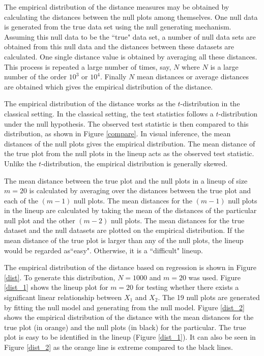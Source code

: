 \documentclass[12]{article}
\begin{document}
The empirical distribution of the distance measures may be obtained by calculating the distances between the null plots among themselves. One null data is generated from the true data set using the null generating mechanism. Assuming this null data to be the ``true" data set, a number of null data sets are obtained from this null data and the distances between these datasets are calculated. One single distance value is obtained by averaging all these distances. This process is repeated a large number of times, say, $N$ where $N$ is a large number of the order $10^3$ or $10^4$. Finally $N$ mean distances or average distances are obtained which gives the empirical distribution of the distance. 

The empirical distribution of the distance works as the $t$-distribution in the classical setting. In the classical setting, the test statistics follows a $t$-distribution under the null hypothesis. The observed test statistic is then compared to this distribution, as shown in Figure \ref{compare}. In visual inference, the mean distances of the null plots gives the empirical distribution. The mean distance of the true plot from the null plots in the lineup acts as the observed test statistic. Unlike the $t$-distribution, the empirical distribution is generally skewed.

The mean distance between the true plot and the null plots in a lineup of size $m = 20$ is calculated by averaging over the distances between the true plot and each of the  $(m - 1)$ null plots. The mean distances for the $(m - 1)$ null plots in the lineup are calculated by taking the mean of the distances of the particular null plot and the other $(m - 2)$ null plots. The mean distances for the true dataset and the null datasets are plotted on the empirical distribution. If the mean distance of the true plot is larger than any of the null plots, the lineup would be regarded as``easy". Otherwise, it is a ``difficult" lineup. 

The empirical distribution of the distance based on regression is shown in Figure \ref{dist}. To generate this distribution, $N = 1000$ and $m = 20$ was used. Figure \ref{dist_1} shows the lineup plot for $m = 20$ for testing whether there exists a significant linear relationship between $X_1$ and $X_2$. The 19 null plots are generated by fitting the null model and generating from the null model. Figure \ref{dist_2} shows the empirical distribution of the distance with the mean distances for the true plot (in orange) and the null plots (in black) for the particular. The true plot is easy to be identified in the lineup (Figure \ref{dist_1}). It can also be seen in Figure \ref{dist_2} as the orange line is extreme compared to the black lines. 
\end{document}
